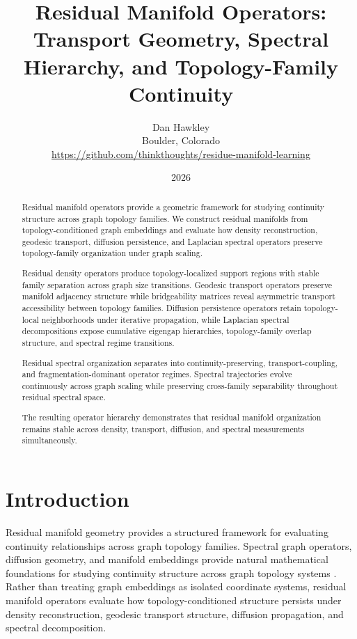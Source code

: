 \documentclass[11pt]{article}
\title{
Residual Manifold Operators:\\
Transport Geometry, Spectral Hierarchy,
and Topology-Family Continuity
}
\author{
Dan Hawkley\\
Boulder, Colorado\\
\url{https://github.com/thinkthoughts/residue-manifold-learning}
}
\date{2026}
\begin{document}
\maketitle

\begin{abstract}

Residual manifold operators provide a geometric framework for studying continuity structure across graph topology families. We construct residual manifolds from topology-conditioned graph embeddings and evaluate how density reconstruction, geodesic transport, diffusion persistence, and Laplacian spectral operators preserve topology-family organization under graph scaling.

Residual density operators produce topology-localized support regions with stable family separation across graph size transitions. Geodesic transport operators preserve manifold adjacency structure while bridgeability matrices reveal asymmetric transport accessibility between topology families. Diffusion persistence operators retain topology-local neighborhoods under iterative propagation, while Laplacian spectral decompositions expose cumulative eigengap hierarchies, topology-family overlap structure, and spectral regime transitions.

Residual spectral organization separates into continuity-preserving, transport-coupling, and fragmentation-dominant operator regimes. Spectral trajectories evolve continuously across graph scaling while preserving cross-family separability throughout residual spectral space.

The resulting operator hierarchy demonstrates that residual manifold organization remains stable across density, transport, diffusion, and spectral measurements simultaneously.

\end{abstract}

\section{Introduction}

Residual manifold geometry provides a structured framework for evaluating continuity relationships across graph topology families. Spectral graph operators, diffusion geometry, and manifold embeddings provide natural mathematical foundations for studying continuity structure across graph topology systems \cite{chung1997spectral,coifman2006diffusion,belkin2003laplacian}. Rather than treating graph embeddings as isolated coordinate systems, residual manifold operators evaluate how topology-conditioned structure persists under density reconstruction, geodesic transport structure, diffusion propagation, and spectral decomposition.
\end{document}
